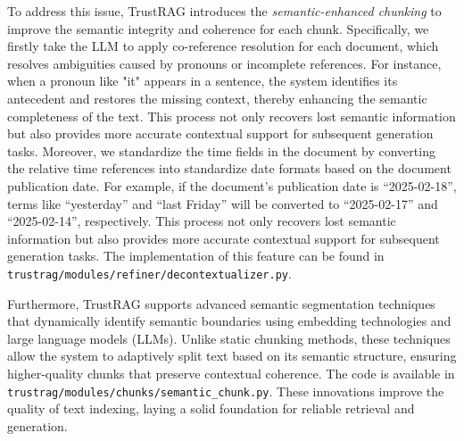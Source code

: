 To address this issue, TrustRAG introduces the \textit{semantic-enhanced chunking} to improve the semantic integrity and coherence for each chunk. Specifically, we firstly take the \ac{LLM} to apply co-reference resolution for each document, which resolves ambiguities caused by pronouns or incomplete references. For instance, when a pronoun like "it" appears in a sentence, the system identifies its antecedent and restores the missing context, thereby enhancing the semantic completeness of the text. This process not only recovers lost semantic information but also provides more accurate contextual support for subsequent generation tasks.
Moreover, we standardize the time fields in the document by converting the relative time references into standardize date formats based on the document publication date. For example, if the document's publication date is ``2025-02-18'', terms like ``yesterday'' and ``last Friday'' will be converted to ``2025-02-17'' and ``2025-02-14'', respectively. 
This process not only recovers lost semantic information but also provides more accurate contextual support for subsequent generation tasks. The implementation of this feature can be found in \texttt{trustrag/modules/refiner/decontextualizer.py}.

Furthermore, TrustRAG supports advanced semantic segmentation techniques that dynamically identify semantic boundaries using embedding technologies and large language models (LLMs). Unlike static chunking methods, these techniques allow the system to adaptively split text based on its semantic structure, ensuring higher-quality chunks that preserve contextual coherence. The code is available in \texttt{trustrag/modules/chunks/semantic\_chunk.py}. These innovations improve the quality of text indexing, laying a solid foundation for reliable retrieval and generation.

